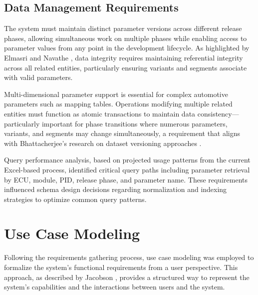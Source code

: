 \subsection{Data Management Requirements}
\label{subsec:data-management-requirements}

The system must maintain distinct parameter versions across different release phases, allowing simultaneous work on multiple phases while enabling access to parameter values from any point in the development lifecycle. As highlighted by Elmasri and Navathe \cite{elmasri2015fundamentals}, data integrity requires maintaining referential integrity across all related entities, particularly ensuring variants and segments associate with valid parameters.

Multi-dimensional parameter support is essential for complex automotive parameters such as mapping tables. Operations modifying multiple related entities must function as atomic transactions to maintain data consistency—particularly important for phase transitions where numerous parameters, variants, and segments may change simultaneously, a requirement that aligns with Bhattacherjee's research on dataset versioning approaches \cite{bhattacherjee2015principles}.

Query performance analysis, based on projected usage patterns from the current Excel-based process, identified critical query paths including parameter retrieval by \ac{ECU}, module, \ac{PID}, release phase, and parameter name. These requirements influenced schema design decisions regarding normalization and indexing strategies to optimize common query patterns.

\section{Use Case Modeling}
\label{sec:use-case-modeling}

Following the requirements gathering process, use case modeling was employed to formalize the system's functional requirements from a user perspective. This approach, as described by Jacobson \cite{jacobson2004use}, provides a structured way to represent the system's capabilities and the interactions between users and the system.

